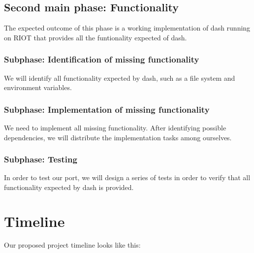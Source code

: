 \documentclass[11pt,
  a4paper,
  BCOR=7mm
]{scrartcl}
\begin{document}
\subsection*{Second main phase: Functionality}
\label{sub:functionality}
The expected outcome of this phase is a working implementation of dash
running on RIOT that provides all the funtionality expected of dash.

\subsubsection*{Subphase: Identification of missing functionality}
\label{ssub:functionality_identification}
We will identify all functionality expected by dash, such as a file
system and environment variables.

\subsubsection*{Subphase: Implementation of missing functionality}
\label{ssub:functionality_implementation}
We need to implement all missing functionality. After identifying
possible dependencies, we will distribute the implementation tasks among
ourselves.

\subsubsection*{Subphase: Testing}
\label{ssub:testing}
In order to test our port, we will design a series of tests in order to
verify that all functionality expected by dash is provided.


\section*{Timeline}
\label{sec:timeline}
Our proposed project timeline looks like this:
\newline

\newcommand{\timeunit}{Weeks}
\pgfmathsetmacro{\timenodewidth}{2cm}
\setcounter{itemnumber}{0}
\newcommand{\lastnode}{n-0}

\newcommand{\timeentry}[2]{%
\stepcounter{itemnumber}
\node[below right,minimum width=\timenodewidth] (n-\theitemnumber) at (\lastnode.south west) {#2};
\node[right] at (n-\theitemnumber.east) {};

\edef\lastnode{n-\theitemnumber}

\expandafter\edef\csname nodetime\theitemnumber \endcsname{#1}
}
\end{document}
